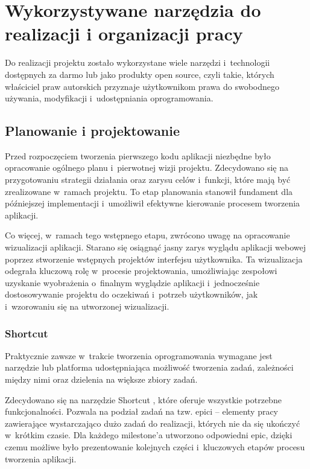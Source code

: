 \section{Wykorzystywane narzędzia do realizacji i organizacji pracy}

Do realizacji projektu zostało wykorzystane wiele narzędzi i~technologii
dostępnych za darmo lub jako produkty open source, czyli takie,
których właściciel praw autorskich przyznaje użytkownikom prawa
do swobodnego używania, modyfikacji i~udostępniania oprogramowania.

\subsection{Planowanie i projektowanie}

Przed rozpoczęciem tworzenia pierwszego kodu aplikacji niezbędne było
opracowanie ogólnego planu i~pierwotnej wizji projektu. Zdecydowano
się na przygotowaniu strategii działania oraz
zarysu celów i~funkcji, które mają być zrealizowane w~ramach projektu.
To etap planowania stanowił fundament dla późniejszej implementacji
i~umożliwił efektywne kierowanie procesem tworzenia aplikacji.

Co więcej, w~ramach tego wstępnego etapu, zwrócono uwagę na
opracowanie wizualizacji aplikacji. Starano się osiągnąć jasny
zarys wyglądu aplikacji webowej poprzez stworzenie wstępnych projektów
interfejsu użytkownika. Ta wizualizacja odegrała kluczową rolę
w~procesie projektowania, umożliwiając zespołowi uzyskanie wyobrażenia
o~finalnym wyglądzie aplikacji i~jednocześnie dostosowywanie projektu
do oczekiwań i~potrzeb użytkowników, jak i~wzorowaniu się na utworzonej
wizualizacji.

\subsubsection{Shortcut}

Praktycznie zawsze w~trakcie tworzenia oprogramowania wymagane jest
narzędzie lub platforma udostępniająca możliwość tworzenia zadań,
zależności między nimi oraz dzielenia na większe zbiory zadań.

Zdecydowano się na narzędzie Shortcut \cite{Shortcut}, które oferuje
wszystkie potrzebne funkcjonalności. Pozwala na podział zadań na tzw.
epici -- elementy pracy zawierające wystarczająco dużo zadań do realizacji,
których nie da się ukończyć w~krótkim czasie. Dla każdego milestone'a
utworzono odpowiedni epic, dzięki czemu możliwe było prezentowanie
kolejnych części i~kluczowych etapów procesu tworzenia aplikacji.

